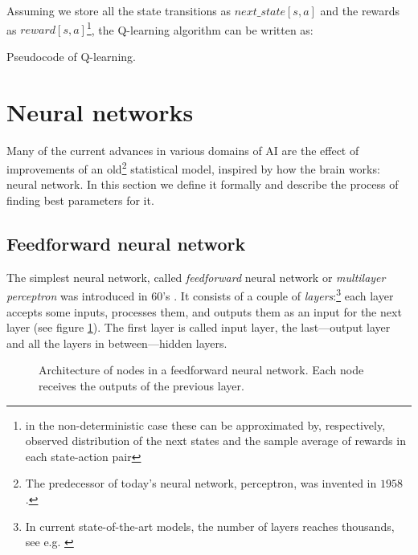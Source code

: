 Assuming we store all the state transitions as $next\_state[s, a]$ and the rewards as $reward[s, a]$\footnote{in the non-deterministic case these can be approximated by, respectively, observed distribution of the next states and the sample average of rewards in each state-action pair}, the Q-learning algorithm can be written as:

\begin{algorithm} \label{qlearning-pseudo}
  \caption{Pseudocode of Q-learning.}
\end{algorithm}
\section{Neural networks}
Many of the current advances in various domains of AI are the effect of improvements of an old\footnote{The predecessor of today's neural network, perceptron, was invented in $1958$ \cite{perceptron}.} statistical model, inspired by how the brain works: neural network. In this section we define it formally and describe the process of finding best parameters for it.

\subsection{Feedforward neural network}
The simplest neural network, called \emph{feedforward} neural network or \emph{multilayer perceptron} was introduced in 60's \cite{mlp}.
It consists of a couple of \emph{layers}:\footnote{In current state-of-the-art models, the number of layers reaches thousands, see e.g. \cite{stochastic}} each layer accepts some inputs, processes them, and outputs them as an input for the next layer (see figure \ref{ann-layers}). The first layer is called input layer, the last---output layer and all the layers in between---hidden layers.
\begin{figure}[h]
  \centering
  \resizebox{0.6\textwidth}{!}{
  
  }
  \caption{Architecture of nodes in a feedforward neural network. Each node receives the outputs of the previous layer.}\label{ann-layers} 
\end{figure}

